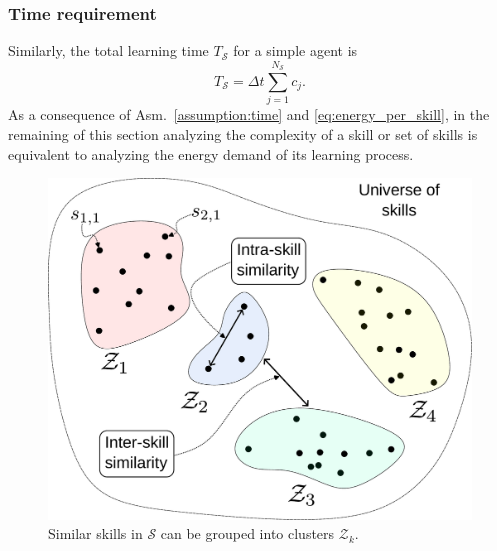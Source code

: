 \subsubsection{\textbf{Time requirement}}
Similarly, the total learning time $T_{\mathcal{S}}$ for a simple agent is
\begin{equation}\label{eq:total_energy}
	T_{\mathcal{S}} = \Delta t \sum_{j=1}^{{N_{\mathcal{S}}}} c_j.
\end{equation}
As a consequence of Asm.~\ref{assumption:time} and \eqref{eq:energy_per_skill}, in the remaining of this section analyzing the complexity of a skill or set of skills is equivalent to analyzing the energy demand of its learning process.
\begin{figure}[!t]
	\centering
	\includegraphics[width=0.95\columnwidth]{fig/skill_similarity.pdf}
	\caption{Similar skills in $\mathcal{S}$ can be grouped into clusters $\mathcal{Z}_k$.}
	\label{fig:skill_similarity}
\end{figure}
